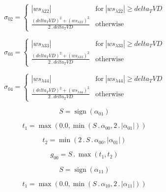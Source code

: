 \documentclass{article}
\begin{document}
\begin{dmath}\sigma_{0 2} = \begin{cases} \left|{ws_{\lambda 22}}\right| & \text{for}\: \left|{ws_{\lambda 22}}\right| \geq delta_TVD \\\frac{\left(delta_TVD \right)^{2} + \left(ws_{\lambda 22} \right)^{2}}{2 \,.\, delta_TVD} & \text{otherwise} 
\end{cases}\end{dmath}

\begin{dmath}\sigma_{0 3} = \begin{cases} \left|{ws_{\lambda 33}}\right| & \text{for}\: \left|{ws_{\lambda 33}}\right| \geq delta_TVD \\\frac{\left(delta_TVD \right)^{2} + \left(ws_{\lambda 33} \right)^{2}}{2 \,.\, delta_TVD} & \text{otherwise} 
\end{cases}\end{dmath}

\begin{dmath}\sigma_{0 4} = \begin{cases} \left|{ws_{\lambda 44}}\right| & \text{for}\: \left|{ws_{\lambda 44}}\right| \geq delta_TVD \\\frac{\left(delta_TVD \right)^{2} + \left(ws_{\lambda 44} \right)^{2}}{2 \,.\, delta_TVD} & \text{otherwise} 
\end{cases}\end{dmath}

\begin{dmath}S = \operatorname{sign}{\left (\alpha_{01} \right )}\end{dmath}

\begin{dmath}t_{1} = \max\left(0.0, \min\left(S \,.\, \alpha_{00}, 2 \,.\, \left|{\alpha_{01}}\right|\right)\right)\end{dmath}

\begin{dmath}t_{2} = \min\left(2 \,.\, S \,.\, \alpha_{00}, \left|{\alpha_{01}}\right|\right)\end{dmath}

\begin{dmath}g_{00} = S \,.\, \max\left(t_{1}, t_{2}\right)\end{dmath}

\begin{dmath}S = \operatorname{sign}{\left (\alpha_{11} \right )}\end{dmath}

\begin{dmath}t_{1} = \max\left(0.0, \min\left(S \,.\, \alpha_{10}, 2 \,.\, \left|{\alpha_{11}}\right|\right)\right)\end{dmath}
\end{document}
